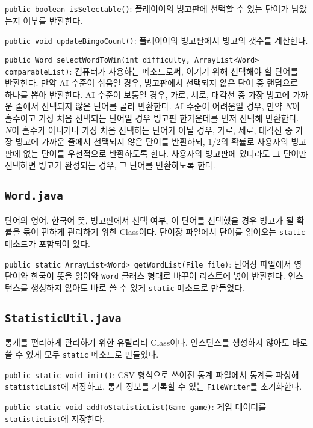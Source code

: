 \texttt{public boolean isSelectable()}:
플레이어의 빙고판에 선택할 수 있는 단어가 남았는지 여부를 반환한다.

\texttt{public void updateBingoCount()}:
플레이어의 빙고판에서 빙고의 갯수를 계산한다.

\texttt{public Word selectWordToWin(int difficulty, ArrayList<Word> comparableList)}:
컴퓨터가 사용하는 메소드로써, 이기기 위해 선택해야 할 단어를 반환한다.
만약 AI 수준이 쉬움일 경우, 빙고판에서 선택되지 않은 단어 중 랜덤으로 하나를 뽑아 반환한다.
AI 수준이 보통일 경우, 가로, 세로, 대각선 중 가장 빙고에 가까운 줄에서 선택되지 않은 단어를 골라 반환한다.
AI 수준이 어려움일 경우, 만약 $N$이 홀수이고 가장 처음 선택되는 단어일 경우 빙고판 한가운데를 먼저 선택해 반환한다.
$N$이 홀수가 아니거나 가장 처음 선택하는 단어가 아닐 경우, 가로, 세로, 대각선 중 가장 빙고에 가까운 줄에서 선택되지 않은 단어를 반환하되,
$1/2$의 확률로 사용자의 빙고판에 없는 단어를 우선적으로 반환하도록 한다.
사용자의 빙고판에 있더라도 그 단어만 선택하면 빙고가 완성되는 경우, 그 단어를 반환하도록 한다.

\subsection{\texttt{Word.java}}
단어의 영어, 한국어 뜻, 빙고판에서 선택 여부, 이 단어를 선택했을 경우 빙고가 될 확률을 묶어 편하게 관리하기 위한 Class이다.
단어장 파일에서 단어를 읽어오는 \texttt{static} 메소드가 포함되어 있다.

\texttt{public static ArrayList<Word> getWordList(File file)}:
단어장 파일에서 영단어와 한국어 뜻을 읽어와 \texttt{Word} 클래스 형태로 바꾸어 리스트에 넣어 반환한다.
인스턴스를 생성하지 않아도 바로 쓸 수 있게 \texttt{static} 메소드로 만들었다.

\subsection{\texttt{StatisticUtil.java}}
통계를 편리하게 관리하기 위한 유틸리티 Class이다.
인스턴스를 생성하지 않아도 바로 쓸 수 있게 모두 \texttt{static} 메소드로 만들었다.

\texttt{public static void init()}:
CSV 형식으로 쓰여진 통계 파일에서 통계를 파싱해 \texttt{statisticList}에 저장하고,
통계 정보를 기록할 수 있는 \texttt{FileWriter}를 초기화한다.

\texttt{public static void addToStatisticList(Game game)}:
게임 데이터를 \texttt{statisticList}에 저장한다.

